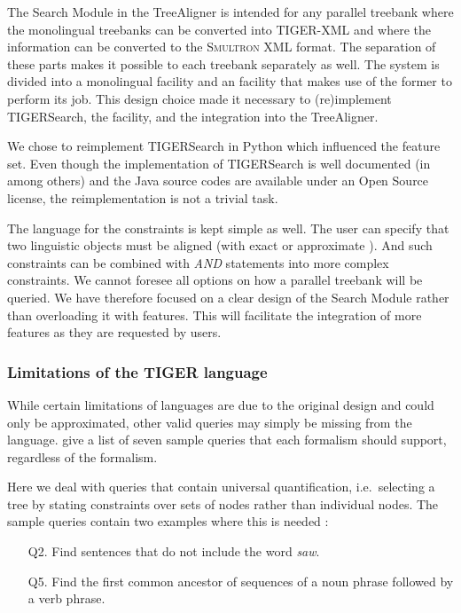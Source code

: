 \documentclass[output=paper]{LSP/langsci}
\begin{document}
The Search Module in the TreeAligner is intended for any parallel treebank where the monolingual treebanks can be converted into TIGER-XML and where the  information can be converted to the S\textsc{multron} XML  format. The separation of these parts makes it possible to  each treebank separately as well. The system is divided into a monolingual  facility and an   facility that makes use of the former to perform its job. This design choice made it necessary to (re)implement TIGERSearch, the   facility, and the integration into the TreeAligner. 

We chose to reimplement TIGERSearch in Python which influenced the feature set. Even though the implementation of TIGERSearch is well documented (in \citealt{Lezius2002a} among others) and the Java source codes are available under an Open Source license, the reimplementation is not a trivial task. 

The  language for the  constraints is kept simple as well. The user can specify that two linguistic objects must be aligned (with exact  or approximate ). And such constraints can be combined with \textit{AND} statements into more complex constraints. We cannot foresee all options on how a parallel treebank will be queried. We have therefore focused on a clear design of the Search Module rather than overloading it with features. This will facilitate the integration of more features as they are requested by users. 

\subsubsection{Limitations of the TIGER  language}\label{sec:volk:3.2.1}

While certain limitations of  languages are due to the original design and could only be approximated, other valid queries may simply be missing from the  language. \citet{Lai2004} give a list of seven sample queries that each  formalism should support, regardless of the  formalism. 

Here we deal with queries that contain universal quantification, i.e.~selecting a tree by stating constraints over sets of nodes rather than individual nodes. The sample queries contain two examples where this is needed \citep{Lai2004}: 

\begin{itemize}
 \item[Q2.] Find sentences that do not include the word \textit{saw}.  
 \item[Q5.] Find the first common ancestor of sequences of a noun phrase followed by a verb phrase.
\end{itemize}
\end{document}
